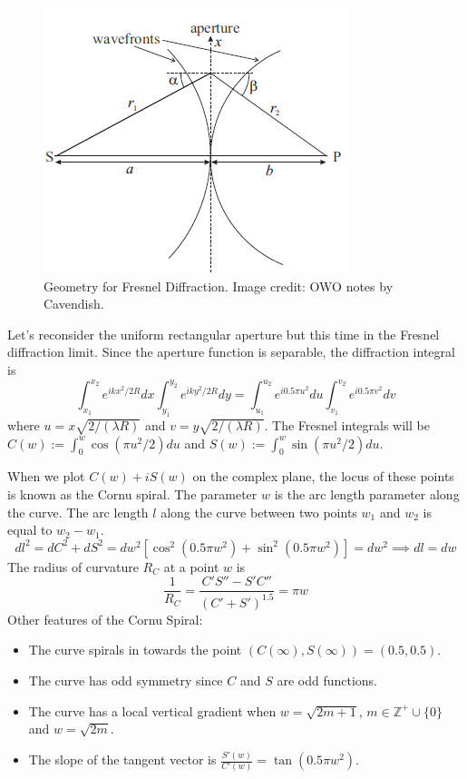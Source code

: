 \documentclass[a4paper]{article}
\begin{document}
\begin{figure}[H]
    \centering
    \includegraphics[scale=0.95]{fresnel.PNG}
    \caption{Geometry for Fresnel Diffraction. Image credit: OWO notes by Cavendish.}
\end{figure}
\begin{eg}
Let's reconsider the uniform rectangular aperture but this time in the Fresnel diffraction limit. Since the aperture function is separable, the diffraction integral is
$$\int_{x_1}^{x_2}e^{ikx^2/2R}dx\int_{y_1}^{y_2}e^{iky^2/2R}dy=\int_{u_1}^{u_2}e^{i0.5\pi u^2}du\int_{v_1}^{v_2}e^{i0.5\pi v^2}dv$$
where $u=x\sqrt{2/(\lambda R)}$ and $v=y\sqrt{2/(\lambda R)}$. The Fresnel integrals will be $C(w):=\int_0^w\cos(\pi u^2/2)du$ and $S(w):=\int_0^w\sin(\pi u^2/2)du$.
\end{eg}
\begin{Note}
When we plot $C(w)+iS(w)$ on the complex plane, the locus of these points is known as the Cornu spiral. The parameter $w$ is the arc length parameter along the curve. The arc length $l$ along the curve between two points $w_1$ and $w_2$ is equal to $w_2-w_1$.
$$dl^2=dC^2+dS^2=dw^2[\cos^2(0.5\pi w^2)+\sin^2(0.5\pi w^2)]=dw^2\implies dl=dw$$
The radius of curvature $R_C$ at a point $w$ is
$$\frac{1}{R_C}=\frac{C'S''-S'C''}{(C'+S')^{1.5}}=\pi w$$
Other features of the Cornu Spiral:
\begin{itemize}
    \item The curve spirals in towards the point $(C(\infty), S(\infty))=(0.5,0.5)$. 
    \item The curve has odd symmetry since $C$ and $S$ are odd functions.
    \item The curve has a local  vertical gradient when $w=\sqrt{2m+1}$, $m\in\mathbb{Z}^+\cup\{0\}$ and $w=\sqrt{2m}$.
    \item The slope of the tangent vector is $\frac{S'(w)}{C'(w)}=\tan(0.5\pi w^2)$.
\end{itemize}
\end{Note}
\end{document}

